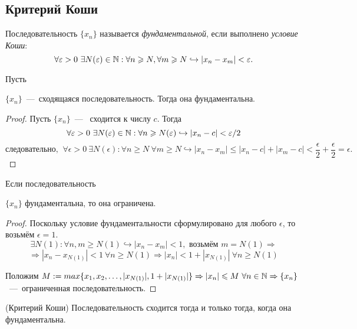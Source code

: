 \subsection{Критерий Коши}
\begin{definition}
    Последовательность $\{ x_{n} \}$ называется \textit{фундаментальной}, если выполнено \textit{условие Коши}:
    $$ \forall \varepsilon > 0 \  \exists N (\varepsilon) \in \mathbb{N}: \forall n \geqslant N, \forall m \geqslant N \hookrightarrow |x_{n} - x_{m}| < \varepsilon. $$
\end{definition}
\begin{lemma}
    \hypertarget{lemm2.10}{Пусть} $\{ x_{n} \}$~---~сходящаяся последовательность. Тогда она фундаментальна.
\end{lemma}
\begin{proof}
    Пусть $\{ x_{n} \}$~---~ сходится к числу $c$. Тогда
    $$ \forall \varepsilon > 0 \  \exists N (\varepsilon) \in \mathbb{N}: \forall n \geqslant N (\varepsilon) \hookrightarrow |x_{n} - c| < \varepsilon / 2$$
    $$ \text{следовательно, }\  \forall \epsilon > 0  \  \exists N (\epsilon): \forall n \geq N \  \forall m \geq N \hookrightarrow |x_{n} - x_{m}| \leq |x_{n} - c| + |x_{m} - c| < \frac{\epsilon}{2} + \frac{\epsilon}{2} = \epsilon.$$
\end{proof}
\begin{lemma}
    \hypertarget{lemm2.11}{Если последовательность} $\{ x_{n} \}$ фундаментальна, то она ограничена.
\end{lemma}
\begin{proof}
    Поскольку условие фундаментальности сформулировано для любого $\epsilon$, то возьмём $\epsilon = 1$.
    $$ \exists N (1): \forall n, m \geq N (1) \hookrightarrow |x_{n} - x_{m}| < 1, \text{ возьмём $m = N (1)$} \Rightarrow$$
    $$ \Rightarrow |x_{n} - x_{N (1)}| < 1 \  \forall n \geq N (1) \Rightarrow |x_{n}| < 1 + |x_{N (1)}| \  \forall n \geq N (1)$$

    Положим $M := max \{ x_{1}, x_{2}, \ldots, |x_{N (1)}|, 1 + |x_{N (1)}|\} \Rightarrow |x_{n}| \leqslant M \   \forall n \in \mathbb{N} \Rightarrow \{ x_{n} \}$~---~ограниченная последовательность.
\end{proof}
\begin{theorem}
    (Критерий Коши) Последовательность сходится тогда и только тогда, когда она фундаментальна.
\end{theorem}
